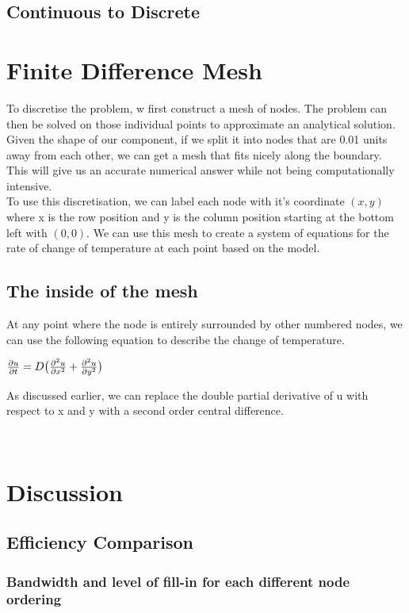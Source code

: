 \documentclass[12pt,a4paper]{article}
\begin{document}
\subsection{Continuous to Discrete}
\clearpage

\section{Finite Difference Mesh}
To discretise the problem, w first construct a mesh of nodes. The problem can then be solved on those individual points to approximate an analytical solution. Given the shape of our component, if we split it into nodes that are 0.01 units away from each other, we can get a mesh that fits nicely along the boundary. This will give us an accurate numerical answer while not being computationally intensive. 
\\
To use this discretisation, we can label each node with it's coordinate $(x,y)$ where x is the row position and y is the column position starting at the bottom left with $(0,0)$. We can use this mesh to create a system of equations for the rate of change of temperature at each point based on the model.
\subsection{The inside of the mesh}
At any point where the node is entirely surrounded by other numbered nodes, we can use the following equation to describe the change of temperature.
\begin{center}
$\frac{\partial u}{\partial t}=D\big{(}\frac{\partial^2 u}{\partial x^2}+\frac{\partial^2 u}{\partial y^2}\big{)}$
\end{center}
As discussed earlier, we can replace the double partial derivative of u with respect to x and y with a second order central difference. %
\begin{center}
$ $
\end{center}

\section{Discussion}

\subsection{Efficiency Comparison}

\subsubsection{Bandwidth and level of fill-in for each different node ordering}
\end{document}
